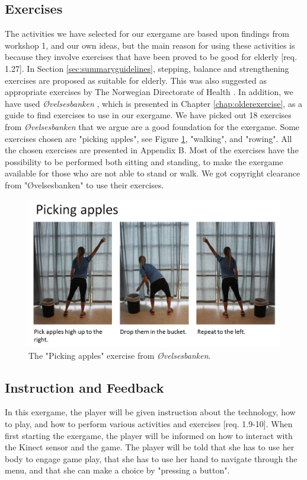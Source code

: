 \subsection{Exercises}
The activities we have selected for our exergame are based upon findings from workshop 1, and our own ideas, but the main reason for using these activities is because they involve exercises that have been proved to be good for elderly [req. 1.27]. In Section \ref{sec:summaryguidelines}, stepping, balance and strengthening exercises are proposed as suitable for elderly. This was also suggested as appropriate exercises by The Norwegian Directorate of Health \cite{aktivitetsbok}. In addition, we have used \emph{Øvelsesbanken} \cite{eldretrening}, which is presented in Chapter \ref{chap:olderexercise}, as a guide to find exercises to use in our exergame. We have picked out 18 exercises from \emph{Øvelsesbanken} that we argue are a good foundation for the exergame. Some exercises chosen are "picking apples", see Figure \ref{pickingapples}, "walking", and "rowing". All the chosen exercises are presented in Appendix B. Most of the exercises have the possibility to be performed both sitting and standing, to make the exergame available for those who are not able to stand or walk. We got copyright clearance from "Øvelsesbanken" to use their exercises.  


\begin{figure} [H]
\centering
\includegraphics[scale=0.5]{PickingApplesAlone.jpg}
\caption[Exercise - picking apples]{The "Picking apples" exercise from \emph{Øvelsesbanken}.}
\label{pickingapples}
\end{figure}

\subsection{Instruction and Feedback}
In this exergame, the player will be given instruction about the technology, how to play, and how to perform various activities and exercises [req. 1.9-10]. When first starting the exergame, the player will be informed on how to interact with the Kinect sensor and the game. The player will be told that she has to use her body to engage game play, that she has to use her hand to navigate through the menu, and that she can make a choice by "pressing a button". 

